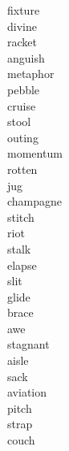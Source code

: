 \documentclass[b5paper, 11pt]{ctexart}
\begin{document}
\begin{multicols*}{3}
\begin{description}
\item[fixture]

\item[divine]

\item[racket]

\item[anguish]

\item[metaphor]

\item[pebble]

\item[cruise]

\item[stool]

\item[outing]

\item[momentum]

\item[rotten]

\item[jug]

\item[champagne]

\item[stitch]

\item[riot]

\item[stalk]

\item[elapse]

\item[slit]

\item[glide]

\item[brace]

\item[awe]

\item[stagnant]

\item[aisle]

\item[sack]

\item[aviation]

\item[pitch]

\item[strap]

\item[couch]


\end{description}
\end{multicols*}
\end{document}
